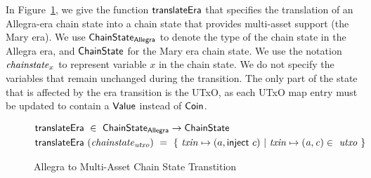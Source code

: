 In Figure~\ref{fig:functions:to-ma}, we give the function $\mathsf{translateEra}$ that
specifies the translation of an Allegra-era chain state into a chain state that provides multi-asset support
(the Mary era).
We use $\mathsf{ChainState}_{\mathsf{Allegra}}$ to denote the type of the chain state
in the Allegra era, and $\mathsf{ChainState}$ for the Mary era chain state.
We use the notation $\mathit{chainstate}_x$ to represent
variable $x$ in the chain state. We do not specify the variables that remain
unchanged during the transition.
The only part of the state that is affected by the era transition is the UTxO, as
each UTxO map entry must be updated to contain a $\mathsf{Value}$ instead of $\mathsf{Coin}$.

\begin{figure}[htb]
  \begin{align*}
      & \mathsf{translateEra} ~\in~ \mathsf{ChainState}_{\mathsf{Allegra}}  \to \mathsf{ChainState}  \\
      & \mathsf{translateEra}~(\mathit{chainstate}_{\mathit{utxo}}) ~=~ \{~ \mathit{txin} \mapsto (a,\mathsf{inject}~c) ~\vert~
      \mathit{txin} \mapsto \mathit{(a,c)}\in ~\mathit{utxo}~\}
  \end{align*}
  \caption{Allegra to Multi-Asset Chain State Transtition}
  \label{fig:functions:to-ma}
\end{figure}
